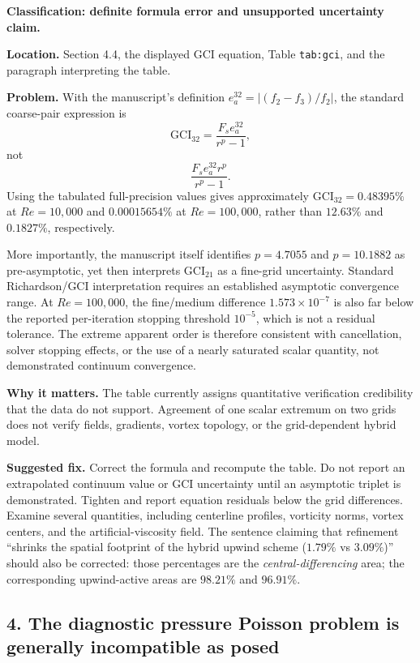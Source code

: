 \documentclass[11pt]{article}
\begin{document}
\textbf{Classification: definite formula error and unsupported uncertainty claim.}

\textbf{Location.} Section 4.4, the displayed GCI equation, Table \texttt{tab:gci}, and the paragraph interpreting the table.

\textbf{Problem.} With the manuscript's definition
$e_a^{32}=|(f_2-f_3)/f_2|$, the standard coarse-pair expression is
\[
\mathrm{GCI}_{32}=\frac{F_s e_a^{32}}{r^p-1},
\]
not
\[
\frac{F_s e_a^{32}r^p}{r^p-1}.
\]
Using the tabulated full-precision values gives approximately
$\mathrm{GCI}_{32}=0.48395\%$ at $Re=10{,}000$ and
$0.00015654\%$ at $Re=100{,}000$, rather than $12.63\%$ and
$0.1827\%$, respectively.

More importantly, the manuscript itself identifies $p=4.7055$ and $p=10.1882$ as pre-asymptotic, yet then interprets $\mathrm{GCI}_{21}$ as a fine-grid uncertainty.  Standard Richardson/GCI interpretation requires an established asymptotic convergence range.  At $Re=100{,}000$, the fine/medium difference
$1.573\times10^{-7}$ is also far below the reported per-iteration stopping threshold $10^{-5}$, which is not a residual tolerance.  The extreme apparent order is therefore consistent with cancellation, solver stopping effects, or the use of a nearly saturated scalar quantity, not demonstrated continuum convergence.

\textbf{Why it matters.} The table currently assigns quantitative verification credibility that the data do not support.  Agreement of one scalar extremum on two grids does not verify fields, gradients, vortex topology, or the grid-dependent hybrid model.

\textbf{Suggested fix.} Correct the formula and recompute the table.  Do not report an extrapolated continuum value or GCI uncertainty until an asymptotic triplet is demonstrated.  Tighten and report equation residuals below the grid differences.  Examine several quantities, including centerline profiles, vorticity norms, vortex centers, and the artificial-viscosity field.  The sentence claiming that refinement ``shrinks the spatial footprint of the hybrid upwind scheme ($1.79\%$ vs $3.09\%$)'' should also be corrected: those percentages are the \emph{central-differencing} area; the corresponding upwind-active areas are $98.21\%$ and $96.91\%$.

\subsection*{4. The diagnostic pressure Poisson problem is generally incompatible as posed}
\end{document}
